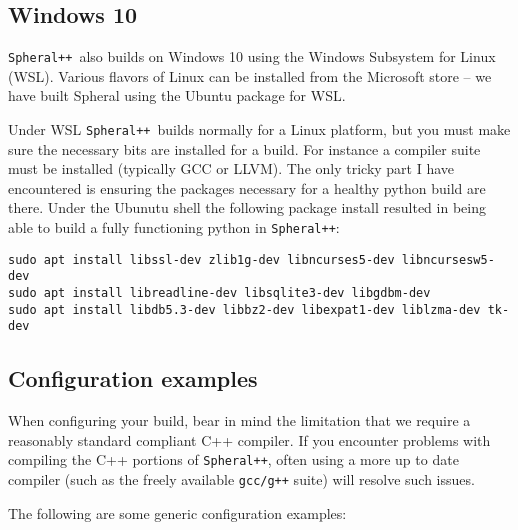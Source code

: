 \documentclass{article}
\newcommand{\Spheral}{{\tt Spheral++}}
\begin{document}
\subsection{Windows 10}
\Spheral\ also builds on Windows 10 using the Windows Subsystem for Linux (WSL).  Various flavors of Linux can be installed from the Microsoft store -- we have built Spheral using the Ubuntu package for WSL.

Under WSL \Spheral\ builds normally for a Linux platform, but you must make sure the necessary bits are installed for a build.  For instance a compiler suite must be installed (typically GCC or LLVM).  The only tricky part I have encountered is ensuring the packages necessary for a healthy python build are there.  Under the Ubunutu shell the following package install resulted in being able to build a fully functioning python in \Spheral:
\begin{verbatim}
sudo apt install libssl-dev zlib1g-dev libncurses5-dev libncursesw5-dev 
sudo apt install libreadline-dev libsqlite3-dev libgdbm-dev 
sudo apt install libdb5.3-dev libbz2-dev libexpat1-dev liblzma-dev tk-dev
\end{verbatim}

\subsection{Configuration examples}
When configuring your build, bear in mind the limitation that we require a reasonably standard compliant C++ compiler.  If you encounter problems with compiling the C++ portions of \Spheral, often using a more up to date compiler (such as the freely available \verb.gcc/g++. suite) will resolve such issues.

The following are some generic configuration examples:
\end{document}
